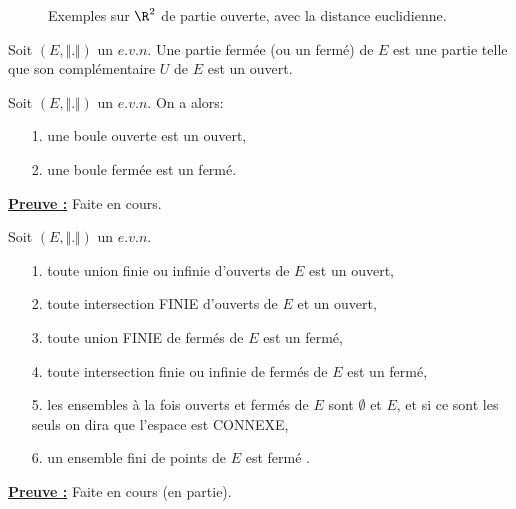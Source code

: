 \documentclass[class=report,crop=false]{standalone}
\begin{document}
 \begin{figure}[!h]
    \caption{Exemples sur $\R^2$ de partie ouverte, avec la distance euclidienne.}
      \label{fig:ouvert}
\end{figure}



\begin{definition}
\textcolor[rgb]{0.73,0.00,0.00}{
\noindent Soit $(E,\Vert . \Vert)$ un $e.v.n$. Une partie fermée (ou un fermé) de $E$ est une partie telle que son complémentaire
$U$ de $E$ est un ouvert. 
}
\end{definition}






\begin{proposition}
\textcolor[rgb]{0.50,0.00,0.25}{
\noindent Soit $(E,\Vert . \Vert)$ un $e.v.n$. On a alors:
 \begin{itemize}
 \item[1.] une boule ouverte est un ouvert,
 \item[2.] une boule fermée est un fermé.
 \end{itemize}
}
\end{proposition}



\noindent \underline{\bf Preuve :}
Faite en cours.



\begin{proposition}
\textcolor[rgb]{0.50,0.00,0.25}
{ Soit $(E,\Vert . \Vert)$ un $e.v.n$.
 \begin{itemize}
  \item[1.] toute union finie ou infinie d'ouverts de $E$  est un ouvert,
  \item[2.] toute intersection FINIE d'ouverts de $E$ et un ouvert,
  \item[3.] toute union FINIE de fermés de $E$ est un fermé, 
  \item[4.] toute intersection finie ou infinie de fermés de $E$ est un fermé,
  \item[5.] les  ensembles à la fois ouverts et fermés de $E$ sont $\emptyset$ et $E$, et si ce sont les seuls on dira que l'espace est CONNEXE,
 \item[6.] un ensemble fini de points de $E$ est fermé .
 \end{itemize}
}
\end{proposition}
\noindent \underline{\bf Preuve :}
Faite en cours (en partie).
\end{document}
